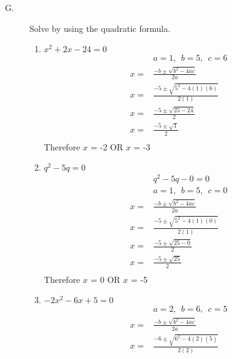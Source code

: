\documentclass{article}
\begin{document}
\begin{description}
    \item[G. ] Solve by using the quadratic formula.
        \begin{enumerate}
            \item $x^2 + 2x - 24 = 0$
                  \begin{equation}
                      \begin{split}
                          &a = 1, \ \ b = 5, \ \ c=6 \\
                          x = & \frac{-b\pm \sqrt{b^2 - 4ac}}{2a}\\
                          x = & \frac{-5\pm \sqrt{5^2 - 4(1)(6)}}{2(1)}\\
                          x = & \frac{-5\pm \sqrt{25 - 24}}{2}\\
                          x = & \frac{-5\pm \sqrt{1}}{2}\\
                      \end{split}
                  \end{equation}
                  Therefore $x$ = -2 OR $x$ = -3
            \item $q^2 - 5q = 0$
                  \begin{equation}
                      \begin{split}
                          & q^2 - 5q - 0 = 0\\
                          &a = 1, \ \ b = 5, \ \ c = 0 \\
                          x = & \frac{-b\pm \sqrt{b^2 - 4ac}}{2a}\\
                          x = & \frac{-5\pm \sqrt{5^2 - 4(1)(0)}}{2(1)}\\
                          x = & \frac{-5\pm \sqrt{25 - 0}}{2}\\
                          x = & \frac{-5\pm \sqrt{25}}{2}\\
                      \end{split}
                  \end{equation}
                  Therefore $x$ = 0 OR $x$ = -5
            \item $-2x^2 -6x + 5 = 0$
                  \begin{equation}
                      \begin{split}
                          &a = 2, \ \ b = 6, \ \ c = 5 \\
                          x = & \frac{-b\pm \sqrt{b^2 - 4ac}}{2a}\\
                          x = & \frac{-6\pm \sqrt{6^2 - 4(2)(5)}}{2(2)}\\

\end{split}
\end{equation}
\end{enumerate}
\end{description}
\end{document}
